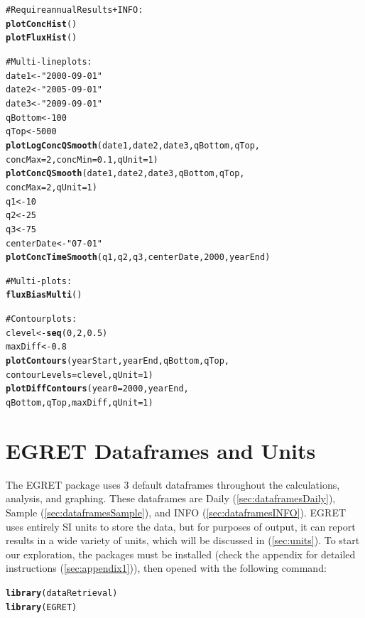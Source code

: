 \documentclass[a4paper,11pt]{article}\usepackage{graphicx, color}
\makeatletter
\newcommand{\hlfunctioncall}[1]{\textcolor[rgb]{0.501960784313725,0,0.329411764705882}{\textbf{#1}}}%
\newcommand{\hlstring}[1]{\textcolor[rgb]{0.6,0.6,1}{#1}}%
\newcommand{\hlcomment}[1]{\textcolor[rgb]{0.180392156862745,0.6,0.341176470588235}{#1}}%
\newenvironment{kframe}{%
 \def\at@end@of@kframe{}%
 \ifinner\ifhmode%
  \def\at@end@of@kframe{\end{minipage}}%
  \begin{minipage}{\columnwidth}%
 \fi\fi%
 \def\FrameCommand##1{\hskip\@totalleftmargin \hskip-\fboxsep
 \colorbox{shadecolor}{##1}\hskip-\fboxsep
     \hskip-\linewidth \hskip-\@totalleftmargin \hskip\columnwidth}%
 \MakeFramed {\advance\hsize-\width
   \@totalleftmargin\z@ \linewidth\hsize
   \@setminipage}}%
 {\par\unskip\endMakeFramed%
 \at@end@of@kframe}
\newenvironment{knitrout}{}{} %
\makeatother
\begin{document}
\begin{knitrout}
\begin{kframe}
\begin{alltt}
\hlcomment{#Require annualResults + INFO:}
\hlfunctioncall{plotConcHist}()
\hlfunctioncall{plotFluxHist}()

\hlcomment{# Multi-line plots:}
date1 <- \hlstring{"2000-09-01"}
date2 <- \hlstring{"2005-09-01"}
date3 <- \hlstring{"2009-09-01"}
qBottom<-100
qTop<-5000
\hlfunctioncall{plotLogConcQSmooth}(date1, date2, date3, qBottom, qTop, 
                   concMax=2, concMin=0.1,qUnit=1)
\hlfunctioncall{plotConcQSmooth}(date1, date2, date3, qBottom, qTop, 
                   concMax=2,qUnit=1)
q1 <- 10
q2 <- 25
q3 <- 75
centerDate <- \hlstring{"07-01"}
\hlfunctioncall{plotConcTimeSmooth}(q1, q2, q3, centerDate, 2000, yearEnd)

\hlcomment{# Multi-plots:}
\hlfunctioncall{fluxBiasMulti}()

\hlcomment{#Contour plots:}
clevel<-\hlfunctioncall{seq}(0,2,0.5)
maxDiff<-0.8
\hlfunctioncall{plotContours}(yearStart,yearEnd,qBottom,qTop, 
             contourLevels = clevel,qUnit=1)
\hlfunctioncall{plotDiffContours}(year0=2000,yearEnd,
                 qBottom,qTop,maxDiff,qUnit=1)

\end{alltt}
\end{kframe}
\end{knitrout}



\section{EGRET Dataframes and Units}
\label{sec:dataframes}
The EGRET package uses 3 default dataframes throughout the calculations, analysis, and graphing. These dataframes are Daily (\ref{sec:dataframesDaily}), Sample (\ref{sec:dataframesSample}), and INFO (\ref{sec:dataframesINFO}). EGRET uses entirely SI units to store the data, but for purposes of output, it can report results in a wide variety of units, which will be discussed in (\ref{sec:units}). To start our exploration, the packages must be installed (check the appendix for detailed instructions (\ref{sec:appendix1})), then opened with the following command:

\begin{knitrout}
\color{fgcolor}\begin{kframe}
\begin{alltt}
\hlfunctioncall{library}(dataRetrieval)
\hlfunctioncall{library}(EGRET)
\end{alltt}
\end{kframe}
\end{knitrout}
\end{document}
